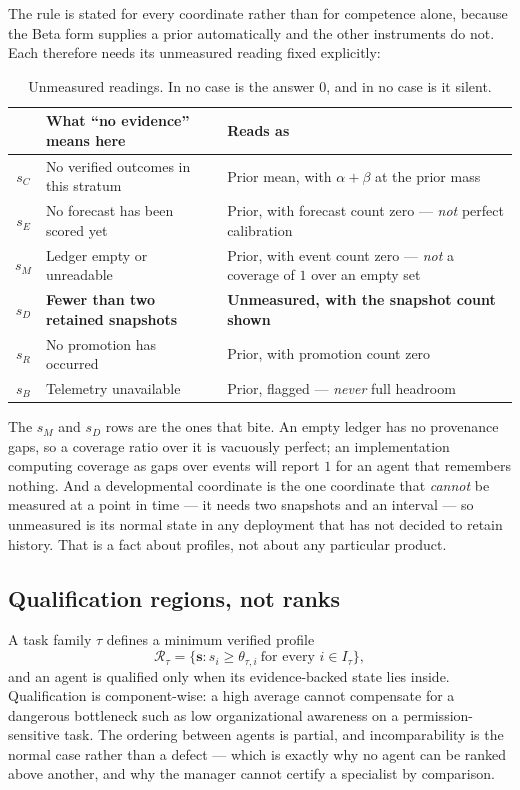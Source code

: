 \documentclass[11pt]{article}
\begin{document}
The rule is stated for every coordinate rather than for competence alone, because the Beta form supplies a prior automatically and the other instruments do not. Each therefore needs its unmeasured reading fixed explicitly:

\begin{table}[h]
\centering\small
\caption{Unmeasured readings. In no case is the answer $0$, and in no case is it silent.}
\label{tab:unmeasured}
\begin{tabular}{@{}cL{5.0cm}L{6.6cm}@{}}
\toprule
& \textbf{What ``no evidence'' means here} & \textbf{Reads as} \\
\midrule
$s_C$ & No verified outcomes in this stratum & Prior mean, with $\alpha+\beta$ at the prior mass \\
$s_E$ & No forecast has been scored yet & Prior, with forecast count zero --- \emph{not} perfect calibration \\
$s_M$ & Ledger empty or unreadable & Prior, with event count zero --- \emph{not} a coverage of $1$ over an empty set \\
$s_D$ & \textbf{Fewer than two retained snapshots} & \textbf{Unmeasured, with the snapshot count shown} \\
$s_R$ & No promotion has occurred & Prior, with promotion count zero \\
$s_B$ & Telemetry unavailable & Prior, flagged --- \emph{never} full headroom \\
\bottomrule
\end{tabular}
\end{table}

The $s_M$ and $s_D$ rows are the ones that bite. An empty ledger has no provenance gaps, so a coverage ratio over it is vacuously perfect; an implementation computing coverage as gaps over events will report $1$ for an agent that remembers nothing. And a developmental coordinate is the one coordinate that \emph{cannot} be measured at a point in time --- it needs two snapshots and an interval --- so unmeasured is its normal state in any deployment that has not decided to retain history. That is a fact about profiles, not about any particular product.

\subsection{Qualification regions, not ranks}

A task family $\tau$ defines a minimum verified profile
\begin{equation}
\mathcal{R}_\tau=\{\mathbf{s}: s_i\ge\theta_{\tau,i}\ \text{for every } i\in I_\tau\},
\label{eq:region}
\end{equation}
and an agent is qualified only when its evidence-backed state lies inside. Qualification is component-wise: a high average cannot compensate for a dangerous bottleneck such as low organizational awareness on a permission-sensitive task. The ordering between agents is partial, and incomparability is the normal case rather than a defect --- which is exactly why no agent can be ranked above another, and why the manager cannot certify a specialist by comparison.
\end{document}
